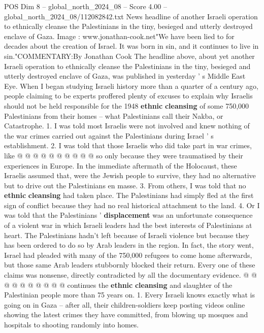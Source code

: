 \begin{textsample}{POS Dim 8 – global\_north\_2024\_08 – Score 4.00 – global\_north\_2024\_08/112082842.txt}  \label{ex:f8_pos_325}
News headline of another Israeli operation to ethnically cleanse the Palestinians in the tiny, besieged and utterly destroyed enclave of Gaza.
Image : www.jonathan-cook.net"We have been lied to for decades about the creation of Israel.
It was born in sin, and it continues to live in sin."COMMENTARY:By Jonathan Cook The headline above, about yet another Israeli operation to ethnically cleanse the Palestinians in the tiny, besieged and utterly destroyed enclave of Gaza, was published in yesterday ' s Middle East Eye.
When I began studying Israeli history more than a quarter of a century ago, people claiming to be experts proffered plenty of excuses to explain why Israelis should not be held responsible for the 1948 \textbf{ethnic} \textbf{cleansing} of some 750,000 Palestinians from their homes -- what Palestinians call their Nakba, or Catastrophe. 1.
I was told most Israelis were not involved and knew nothing of the war crimes carried out against the Palestinians during Israel ' s establishment. 2.
I was told that those Israelis who did take part in war crimes, like @ @ @ @ @ @ @ @ @ @ so only because they were traumatised by their experiences in Europe.
In the immediate aftermath of the Holocaust, these Israelis assumed that, were the Jewish people to survive, they had no alternative but to drive out the Palestinians en masse. 3.
From others, I was told that no \textbf{ethnic} \textbf{cleansing} had taken place.
The Palestinians had simply fled at the first sign of conflict because they had no real historical attachment to the land. 4.
Or I was told that the Palestinians ' \textbf{displacement} was an unfortunate consequence of a violent war in which Israeli leaders had the best interests of Palestinians at heart.
The Palestinians hadn't left because of Israeli violence but because they has been ordered to do so by Arab leaders in the region.
In fact, the story went, Israel had pleaded with many of the 750,000 refugees to come home afterwards, but those same Arab leaders stubbornly blocked their return.
Every one of these claims was nonsense, directly contradicted by all the documentary evidence. @ @ @ @ @ @ @ @ @ @ continues the \textbf{ethnic} \textbf{cleansing} and slaughter of the Palestinian people more than 75 years on. 1.
Every Israeli knows exactly what is going on in Gaza -- after all, their children-soldiers keep posting videos online showing the latest crimes they have committed, from blowing up mosques and hospitals to shooting randomly into homes.

\end{textsample}
